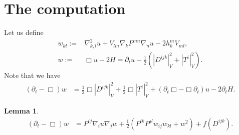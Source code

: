 \documentclass{amsart}
\newtheorem{lemma}[theorem]{Lemma}
\theoremstyle{definition}
\theoremstyle{remark}
\numberwithin{equation}{section}
\begin{document}
\section{The computation}
Let us define
\begin{align*}
w_{kl}:=&\nabla^2_{k,l}u+V_{lm}\nabla_kP^{mn}\nabla_nu-2h_k^mV_{ml},\\
w:=&\Box u-2H=\partial_tu-\frac{1}{2}\left(\left|D^{ijk}\right|^2_V+\left|T^i\right|_V^2\right).
\end{align*}
Note that we have
\begin{align*}
(\partial_t-\Box)w
&= \frac{1}{2}\Box\left|D^{ijk}\right|^2_V+\frac{1}{2}\Box\left|T^i\right|_V^2+(\partial_t \Box-\Box\partial_t) u-2\partial_tH.
\end{align*}
\begin{lemma}
\begin{align*}
(\partial_t-\Box)w&=P^{ij}\nabla_i u\nabla_j w+ \frac{1}{2}\left(P^{ik}P^{jl}w_{ij}w_{kl}+w^2\right)+f(D^{ijk}).\\
\end{align*}
\end{lemma}
\end{document}
